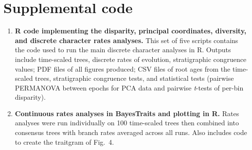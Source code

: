 \documentclass[british,a4paper]{article}
\begin{document}
\section{Supplemental code}\label{supplemental-code}

\begin{enumerate}[label = \textbf{Code \textallsc{S\arabic*}}, align = left,
    ref = {Code \textallsc{S\arabic*}}]
    \item \textbf{R code implementing the disparity, principal coordinates, diversity, and discrete character rates analyses.} This set of five scripts contains the code used to run the main discrete character analyses in R. Outputs include time-scaled trees, discrete rates of evolution, stratigraphic congruence values; PDF files of all figures produced; CSV files of root ages from the time-scaled trees, stratigraphic congruence tests, and statistical tests (pairwise PERMANOVA between epochs for PCA data and pairwise \emph{t}-tests of per-bin disparity).\label{disparity-discrete-code}
    \item \textbf{Continuous rates analyses in BayesTraits and plotting in R.} Rates analyses were run individually on 100 time-scaled trees then combined into consensus trees with branch rates averaged across all runs. Also includes code to create the traitgram of Fig.~4.\label{bayestraits-code}
\end{enumerate}

\printbibliography
\end{document}
